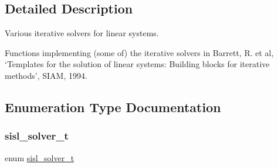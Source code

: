 \subsection{Detailed Description}
Various iterative solvers for linear systems. 

Functions implementing (some of) the iterative solvers in Barrett, R. et al, `Templates for the solution of linear systems\+: Building blocks for iterative methods', S\+I\+AM, 1994. 

\subsection{Enumeration Type Documentation}
\mbox{\label{group__solver_ga1db83bd06f9de0d0a3375f66a57d8f7b}} 
\subsubsection{\texorpdfstring{sisl\+\_\+solver\+\_\+t}{sisl\_solver\_t}}
{\footnotesize\ttfamily enum \mbox{\hyperlink{group__solver_ga1db83bd06f9de0d0a3375f66a57d8f7b}{sisl\+\_\+solver\+\_\+t}}}

